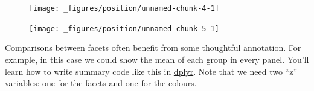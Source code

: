 \begin{Shaded}
\begin{Highlighting}[]
\StringTok{ }\NormalTok{(}
   \NormalTok{(}\NormalTok{, }\NormalTok{(}\NormalTok{, }\NormalTok{, }\NormalTok{)),}
   \NormalTok{(}\NormalTok{, }\NormalTok{(}\NormalTok{, }\NormalTok{, }\NormalTok{)),}
   \NormalTok{letters[}\NormalTok{:}\NormalTok{]}
\NormalTok{)}

\StringTok{ }
\StringTok{  }\NormalTok{(}\NormalTok{(} 
\end{Highlighting}
\end{Shaded}

\begin{figure}[H]
  \centering
  \texttt{[image: \_figures/position/unnamed-chunk-4-1]}
\end{figure}

\begin{Shaded}
\begin{Highlighting}[]
\StringTok{ }
\StringTok{  }\NormalTok{() +}\StringTok{ }
\StringTok{  }
\end{Highlighting}
\end{Shaded}

\begin{figure}[H]
  \texttt{[image: \_figures/position/unnamed-chunk-5-1]}
\end{figure}

Comparisons between facets often benefit from some thoughtful
annotation. For example, in this case we could show the mean of each
group in every panel. You'll learn how to write summary code like this
in \hyperref[cha:dplyr]{dplyr}. Note that we need two ``z'' variables:
one for the facets and one for the colours.

